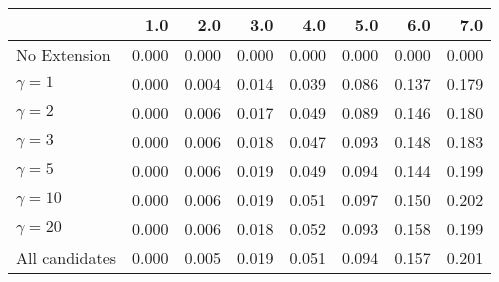 \begin{tabular}{lrrrrrrr}
\toprule
{} &   1.0 &   2.0 &   3.0 &   4.0 &   5.0 &   6.0 &   7.0 \\
\midrule
No Extension   & 0.000 & 0.000 & 0.000 & 0.000 & 0.000 & 0.000 & 0.000 \\
$\gamma = 1$   & 0.000 & 0.004 & 0.014 & 0.039 & 0.086 & 0.137 & 0.179 \\
$\gamma = 2$   & 0.000 & 0.006 & 0.017 & 0.049 & 0.089 & 0.146 & 0.180 \\
$\gamma = 3$   & 0.000 & 0.006 & 0.018 & 0.047 & 0.093 & 0.148 & 0.183 \\
$\gamma = 5$   & 0.000 & 0.006 & 0.019 & 0.049 & 0.094 & 0.144 & 0.199 \\
$\gamma = 10$  & 0.000 & 0.006 & 0.019 & 0.051 & 0.097 & 0.150 & 0.202 \\
$\gamma = 20$  & 0.000 & 0.006 & 0.018 & 0.052 & 0.093 & 0.158 & 0.199 \\
All candidates & 0.000 & 0.005 & 0.019 & 0.051 & 0.094 & 0.157 & 0.201 \\
\bottomrule
\end{tabular}
